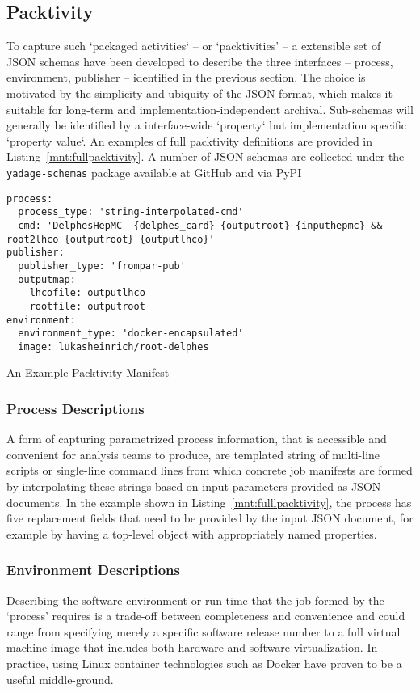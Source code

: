 \documentclass[a4paper]{jpconf}
\begin{document}
\subsection{Packtivity}

To capture such `packaged activities` -- or `packtivities' -- a extensible set of JSON schemas have been developed to describe the three interfaces -- process, environment, publisher -- identified in the previous section. The choice is motivated by the simplicity and ubiquity of the JSON format, which makes it suitable for long-term and implementation-independent archival. Sub-schemas will generally be identified by a interface-wide `property` but implementation specific `property value`. An examples of full packtivity definitions are provided in Listing~\ref{mnt:fullpacktivity}. A number of JSON schemas are collected under the \verb+yadage-schemas+ package available at GitHub and via PyPI\cite{yadage-schemas}

\begin{listing}[!ht]
\begin{verbatim}
process:
  process_type: 'string-interpolated-cmd'
  cmd: 'DelphesHepMC  {delphes_card} {outputroot} {inputhepmc} && root2lhco {outputroot} {outputlhco}'
publisher:
  publisher_type: 'frompar-pub'
  outputmap:
    lhcofile: outputlhco
    rootfile: outputroot
environment:
  environment_type: 'docker-encapsulated'
  image: lukasheinrich/root-delphes
\end{verbatim}
\caption{An Example Packtivity Manifest}
\label{mnt:fullpacktivity}
\end{listing}

\subsubsection{Process Descriptions}
A form of capturing parametrized process information, that is accessible and convenient for analysis teams to produce, are templated string of multi-line scripts or single-line command lines from which concrete job manifests are formed by interpolating these strings based on input parameters provided as JSON documents. In the example shown in Listing~\ref{mnt:fulllpacktivity}, the process has five replacement fields that need to be provided by the input JSON document, for example by having a top-level object with appropriately named properties.

\subsubsection{Environment Descriptions}
Describing the software environment or run-time that the job formed by the `process' requires is a trade-off between completeness and convenience and could range from specifying merely a specific software release number to a full virtual machine image that includes both hardware and software virtualization. In practice, using Linux container technologies such as Docker have proven to be a useful middle-ground.
\end{document}
